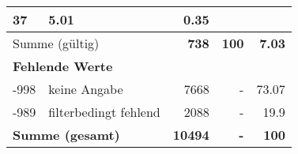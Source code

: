 \begin{longtable}{lXrrr}
       \num{37} &
       \num[round-mode=places,round-precision=2]{5.01} &
         \num[round-mode=places,round-precision=2]{0.35} \\
     \midrule
     \multicolumn{2}{l}{Summe (gültig)} &
       \textbf{\num{738}} &
     \textbf{\num{100}} &
       \textbf{\num[round-mode=places,round-precision=2]{7.03}} \\
     \multicolumn{5}{l}{\textbf{Fehlende Werte}}\\
       -998 &
       keine Angabe &
         \num{7668} &
        - &
         \num[round-mode=places,round-precision=2]{73.07} \\
       -989 &
       filterbedingt fehlend &
         \num{2088} &
        - &
         \num[round-mode=places,round-precision=2]{19.9} \\
     \midrule
     \multicolumn{2}{l}{\textbf{Summe (gesamt)}} &
          \textbf{\num{10494}} &
        \textbf{-} &
        \textbf{\num{100}} \\
     \bottomrule
     \end{longtable}
     
